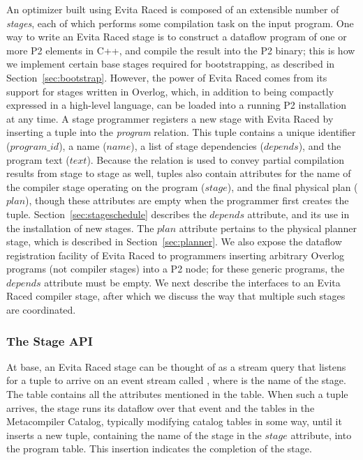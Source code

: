 An optimizer built using Evita Raced is composed of an extensible number of {\em stages}, each of which performs some
compilation task on the input program. One way to write an Evita Raced stage is to construct a dataflow program of one or more P2 elements in C++, and compile the result into the P2 binary; this is how we implement certain base stages required for bootstrapping, as described in Section~\ref{sec:bootstrap}.  However, the power of Evita Raced comes from its support for stages written in Overlog, which, in addition to being compactly expressed in a high-level language, can be loaded into a running P2 installation at any time. 
A stage programmer registers a new stage with Evita Raced by inserting a tuple into the {\em program} relation. 
This tuple contains a unique identifier ($program\_id$), a name
($name$),  a list of stage dependencies ($depends$), and the program
text ($text$). Because the  relation is used to convey
partial compilation results from stage to stage as well, 
tuples also contain attributes for the name of the compiler stage operating 
on the program ($stage$), and the final physical plan ($plan$), though
these attributes are empty when the programmer first creates the tuple. Section~\ref{sec:stageschedule} describes the
$depends$ attribute, and its use in the installation of new stages. The $plan$ attribute pertains to the
physical planner stage, which is described in Section~\ref{sec:planner}.
We also expose the dataflow registration facility of Evita Raced to programmers inserting arbitrary
Overlog programs  (not compiler stages) into a P2 node; for these generic programs, the $depends$ attribute must be empty.  We next describe the 
interfaces to an Evita Raced compiler stage, after which we discuss the way that multiple such stages are coordinated.

\subsubsection{The Stage API}
At base, an Evita Raced stage can be thought of as a stream query that listens for a tuple to arrive on an event stream called , where  is the name of the stage. 
The  table contains all the attributes mentioned in the  table. When such a tuple arrives, the stage runs its dataflow over that event and the tables in the Metacompiler Catalog, typically modifying catalog tables in some way, until it inserts a new  tuple, containing the name of the stage in
the $stage$ attribute, into the program table. This insertion indicates
the completion of the stage.

